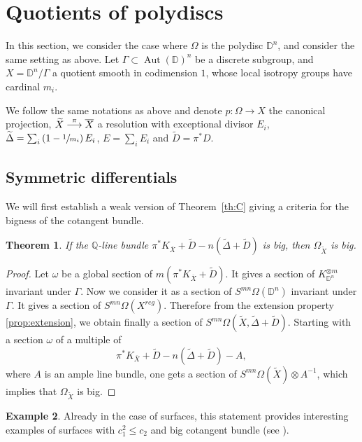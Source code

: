 \documentclass[JEP,XML,SOM,Unicode]{cedram}
\def\To#1{\mathchoice{\xrightarrow{\textstyle\kern4pt#1\kern3pt}}{\stackrel{#1}{\longrightarrow}}{}{}}
\theoremstyle{plain}
\newtheorem{theorem}{Theorem}[section]
\theoremstyle{definition}
\newtheorem{example}[theorem]{Example}
\numberwithin{equation}{theorem}
\DeclareMathOperator{\Aut}{Aut}
\let\wtilde\widetilde
\newcommand\DD{\mathbb D}
\newcommand\QQ{\mathbb Q}
\begin{document}
\section{Quotients of polydiscs}\label{disc}

In this section, we consider the case where $\Omega$ is the polydisc $\DD^n$, and consider the same setting as above. Let $\Gamma \subset \Aut(\DD)^n$ be a discrete subgroup, and $X=\DD^n/\Gamma$ a quotient smooth in codimension $1$, whose local isotropy groups have cardinal $m_i$.

We follow the same notations as above and denote $p : \Omega \to X$ the canonical projection, $\widetilde{X} \To{\pi} \overline{X}$ a resolution with exceptional divisor $E_i$, $\widetilde{\Delta} = \sum_i \left(1 - \sfrac{1}{m_i} \right) E_i$, $E = \sum_i E_i$ and $\widetilde{D} = \pi^\ast D$.

\subsection{Symmetric differentials}
We will first establish a weak version of Theorem~\ref{th:C} giving a criteria for the bigness of the cotangent bundle.

\begin{theorem}\label{big1}
If the $\QQ$-line bundle $\pi^*K_{\overline{X}}+\wtilde{D}-n(\wtilde {\Delta} + \widetilde{D})$ is big, then $\Omega_{\widetilde{X}}$ is big.
\end{theorem}

\begin{proof}
Let $\omega$ be a global section of $m(\pi^*K_{\overline{X}}+\wtilde{D})$. It gives a section of $K_{\DD^n}^{\otimes m}$ invariant under $\Gamma$. Now we consider it as a section of $S^{mn} \Omega (\DD^n)$ invariant under $\Gamma$. It gives a section of $S^{mn} \Omega (X^{reg})$. Therefore from the extension property \ref{prop:extension}, we obtain finally a section of $S^{mn}\Omega(\widetilde{X}, \wtilde{\Delta}+\widetilde{D})$. Starting with a section $\omega$ of a multiple of $$\pi^*K_{\overline{X}}+\wtilde{D}-n(\wtilde {\Delta}+\widetilde{D})-A,$$ where $A$ is an ample line bundle, one gets a section of $S^{mn}\Omega(\widetilde{X})\otimes A^{-1}$, which implies that $\Omega_{\widetilde{X}}$ is big.
\end{proof}

\begin{example}
Already in the case of surfaces, this statement provides interesting examples of surfaces with $c_1^2\leq c_2$ and big cotangent bundle (see \cite{GRR}).
\end{example}
\end{document}
